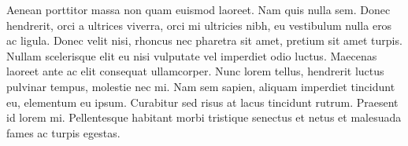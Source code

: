 Aenean porttitor massa non quam euismod laoreet. Nam quis nulla sem. Donec hendrerit, orci a ultrices viverra, orci mi ultricies nibh, eu vestibulum nulla eros ac ligula. Donec velit nisi, rhoncus nec pharetra sit amet, pretium sit amet turpis. Nullam scelerisque elit eu nisi vulputate vel imperdiet odio luctus. Maecenas laoreet ante ac elit consequat ullamcorper. Nunc lorem tellus, hendrerit luctus pulvinar tempus, molestie nec mi. Nam sem sapien, aliquam imperdiet tincidunt eu, elementum eu ipsum. Curabitur sed risus at lacus tincidunt rutrum. Praesent id lorem mi. Pellentesque habitant morbi tristique senectus et netus et malesuada fames ac turpis egestas.
